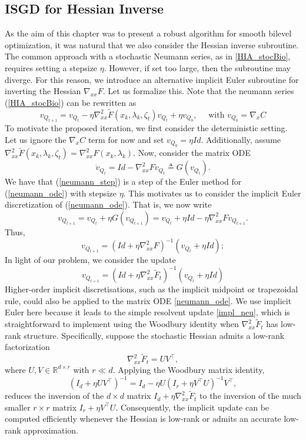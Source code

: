 \documentclass[11pt, twoside]{report}
\begin{document}
\subsection{ISGD for Hessian Inverse}
As the aim of this chapter was to present a robust algorithm for smooth bilevel optimization, it was natural that we also consider the Hessian inverse subroutine. The common approach with a stochastic Neumann series, as in \ref{HIA_stocBio}, requires setting a stepsize $\eta$. However, if set too large, then the subroutine may diverge. For this reason, we introduce an alternative implicit Euler subroutine for inverting the Hessian $\nabla_{xx} F$. Let us formalize this. Note that the neumann series (\ref{HIA_stocBio}) can be rewritten as 
\begin{equation} \label{neumann_step}
    v_{Q_{t+1}} = v_{Q_{t}} - \eta \nabla_{xx}^2 \tilde{F}(x_k,\lambda_k,\zeta_t) v_{Q_{t}} + \eta v_{Q_0}, \quad \text{ with } v_{Q_0} = \nabla_x C
\end{equation}
To motivate the proposed iteration, we first consider the deterministic setting. Let us ignore the $\nabla_x C$ term for now and set $v_{Q_0} = \eta Id$. Additionally, assume $\nabla_{xx}^2 \tilde{F}(x_k,\lambda_k,\zeta_t) = \nabla_{xx}^2 F(x_k,\lambda_k)$. Now, consider the matrix ODE
\begin{equation} \label{neumann_ode}
    \dot{v}_{Q_{t}} = Id - \nabla_{xx}^2 F v_{Q_{t}} \triangleq G(v_{Q_{t}}).
\end{equation}
We have that (\ref{neumann_step}) is a step of the Euler method for (\ref{neumann_ode}) with stepsize $\eta$. This motivates us to consider the implicit Euler discretization of (\ref{neumann_ode}). That is, we now write
\[v_{Q_{t+1}} = v_{Q_{t}} + \eta G(v_{Q_{t+1}}) = v_{Q_{t}} + \eta Id - \eta \nabla_{xx}^2 F v_{Q_{t+1}}.\]
Thus,
\[v_{Q_{t+1}} = (Id + \eta \nabla_{xx}^2 F)^{-1}(v_{Q_{t}} + \eta Id);\]
In light of our problem, we consider the update
\begin{equation} \label{impl_neu}
    v_{Q_{t+1}} = (Id + \eta \nabla_{xx}^2 \tilde{F}_t)^{-1}(v_{Q_{t}} + \eta Id)
\end{equation}
Higher-order implicit discretisations, such as the implicit midpoint or trapezoidal rule, could also be applied to the matrix ODE \eqref{neumann_ode}. We use implicit Euler here because it leads to the simple resolvent update \eqref{impl_neu}, which is straightforward to implement using the Woodbury identity when \(\nabla_{xx}^2 \widetilde F_t\) has low-rank structure. Specifically, suppose the stochastic Hessian admits a low-rank factorization
\[
\nabla_{xx}^{2}\tilde{F}_{t}=UV^{\top},
\]
where $U,V\in\mathbb{R}^{d\times r}$ with $r\ll d$. Applying the Woodbury matrix identity,
\[
\left(I_d+\eta UV^{\top}\right)^{-1}
=
I_d-\eta U\left(I_r+\eta V^{\top}U\right)^{-1}V^{\top},
\]
reduces the inversion of the $d\times d$ matrix
\(
I_d+\eta\nabla_{xx}^{2}\tilde{F}_{t}
\)
to the inversion of the much smaller $r\times r$ matrix
\(
I_r+\eta V^{\top}U
\).
Consequently, the implicit update can be computed efficiently whenever the Hessian is low-rank or admits an accurate low-rank approximation. 
\end{document}
